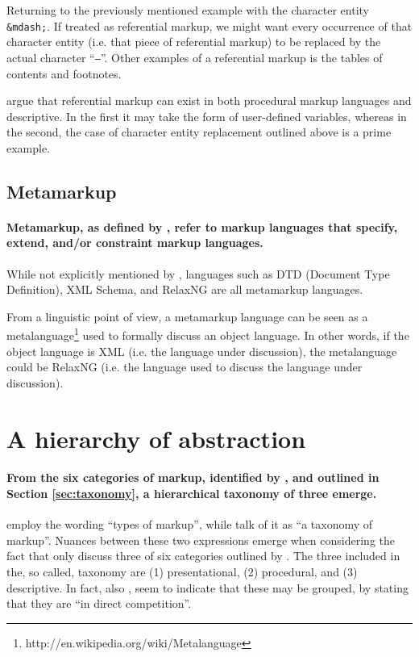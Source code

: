 \documentclass{scrreprt}
\begin{document}
Returning to the previously mentioned example with the character entity \texttt{\&mdash;}. If treated as referential markup, we might want every occurrence of that character entity (i.e. that piece of referential markup) to be replaced by the actual character ``\texttt{--}''. Other examples of a referential markup is the tables of contents and footnotes.

\citet{coombs} argue that referential markup can exist in both procedural markup languages and descriptive. In the first it may take the form of user-defined variables, whereas in the second, the case of character entity replacement outlined above is a prime example.


\subsection{Metamarkup}
\paragraph{Metamarkup, as defined by \citet{coombs}, refer to markup languages that specify, extend, and/or constraint markup languages.} While not explicitly mentioned by \citet{coombs}, languages such as DTD (Document Type Definition), XML Schema, and RelaxNG are all metamarkup languages.


From a linguistic point of view, a metamarkup language can be seen as a metalanguage\footnote{http://en.wikipedia.org/wiki/Metalanguage} used to formally discuss an object language. In other words, if the object language is XML (i.e. the language under discussion), the metalanguage could be RelaxNG (i.e. the language used to discuss the language under discussion).




\section{A hierarchy of abstraction}
\label{sec:abstraction-hierarchy}
\paragraph{From the six categories of markup, identified by \citet{coombs}, and outlined in Section \ref{sec:taxonomy}, a hierarchical taxonomy of three emerge.} \citet{coombs} employ the wording ``types of markup'', while \citet{bray} talk of it as ``a taxonomy of markup''. Nuances between these two expressions emerge when considering the fact that \citet{bray} only discuss three of six categories outlined by \citet{coombs}. The three included in the, so called, taxonomy are (1) presentational, (2) procedural, and (3) descriptive. In fact, also \citet{coombs}, seem to indicate that these may be grouped, by stating that they are ``in direct competition''.
\end{document}
